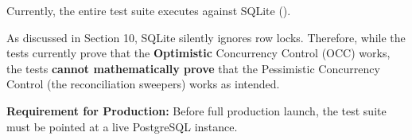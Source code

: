 \begin{tcolorbox}[warningbox={\iconWarning[1.3] Test Environment $\neq$ Production Environment}]
\color{textdark}
Currently, the entire test suite executes against SQLite (). 

As discussed in Section 10, SQLite silently ignores  row locks. Therefore, while the tests currently prove that the \textbf{Optimistic} Concurrency Control (OCC) works, the tests \textbf{cannot mathematically prove} that the Pessimistic Concurrency Control (the reconciliation sweepers) works as intended.

\textbf{Requirement for Production:} Before full production launch, the test suite must be pointed at a live PostgreSQL instance.
\end{tcolorbox}
